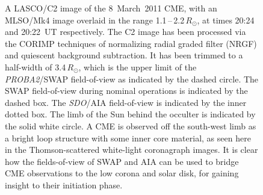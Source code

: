 \documentclass[namedreferences]{solarphysics}
\begin{document}
\begin{article}
\begin{figure}[ht]
\caption{A LASCO/C2 image of the 8~March~2011 CME, with an MLSO/Mk4 image overlaid in the range 1.1\,--\,2.2\,$R_\odot$, at times 20:24 and 20:22~UT respectively. The C2 image has been processed via the CORIMP techniques of normalizing radial graded filter (NRGF) and quiescent background subtraction. It has been trimmed to a half-width of 3.4\,$R_\odot$, which is the upper limit of the \emph{PROBA2}/SWAP field-of-view as indicated by the dashed circle. The SWAP field-of-view during nominal operations is indicated by the dashed box. The \emph{SDO}/AIA field-of-view is indicated by the inner dotted box. The limb of the Sun behind the occulter is indicated by the solid white circle. A CME is observed off the south-west limb as a bright loop structure with some inner core material, as seen here in the Thomson-scattered white-light coronagraph images. It is clear how the fields-of-view of SWAP and AIA can be used to bridge CME observations to the low corona and solar disk, for gaining insight to their initiation phase.}
\label{overlays}
\end{figure}



\end{article}
\end{document}
